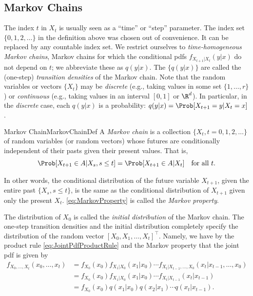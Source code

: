 \subsection{Markov Chains}
The index $t$ in $X_t$ is usually seen as a ``time'' or ``step'' parameter. The index set $\{0, 1, 2, \dots\}$ in the definition above was chosen out of convenience. It can be replaced by any countable index set. We restrict ourselves to \textit{time-homogeneous Markov chains}, Markov chains for which the conditional pdfs $f_{X_{t+1}|X_t}(y|x)$ do not depend on $t$; we abbreviate these as $q(y|x)$. The $\{q(y|x)\}$ are called the (one-step) \textit{transition densities} of the Markov chain. Note that the random variables or vectors $\{X_t\}$ may be \textit{discrete} (e.g., taking values in some set $\{1, \dots, r\}$) or \textit{continuous} (e.g., taking values in an interval $[0, 1]$ or $\R^d$). In particular, in the \textit{discrete} case, each $q(y|x)$ is a probability: $q(y|x) = \Prob[X_{t+1} = y | X_t = x]$.

\begin{defn}{Markov Chain}{MarkovChainDef}
	A \textit{Markov chain} is a collection $\{X_t, t = 0, 1, 2, \dots\}$ of random variables (or random vectors) whose futures are conditionally independent of their pasts given their present values. That is,
	\begin{equation} \label{eq:MarkovProperty}
		\Prob[X_{t+1} \in A | X_s, s \le t] = \Prob[X_{t+1} \in A | X_t] \quad \text{for all } t.
	\end{equation}
\end{defn}
In other words, the conditional distribution of the future variable $X_{t+1}$, given the entire past $\{X_s, s \le t\}$, is the same as the conditional distribution of $X_{t+1}$ given only the present $X_t$. \cref{eq:MarkovProperty} is called the \textit{Markov property}.

The distribution of $X_0$ is called the \textit{initial distribution} of the Markov chain. The one-step transition densities and the initial distribution completely specify the distribution of the random vector $[X_0, X_1, \dots, X_t]^\top$. Namely, we have by the product rule \cref{eq:JointPdfProductRule} and the Markov property that the joint pdf is given by
\begin{align*}
	f_{X_0, \dots, X_t}(x_0, \dots, x_t) & = f_{X_0}(x_0) f_{X_1|X_0}(x_1|x_0) \cdots f_{X_t|X_{t-1}, \dots, X_0}(x_t | x_{t-1}, \dots, x_0) \\
	                                     & = f_{X_0}(x_0) f_{X_1|X_0}(x_1|x_0) \cdots f_{X_t|X_{t-1}}(x_t | x_{t-1})                         \\
	                                     & = f_{X_0}(x_0) q(x_1|x_0) q(x_2|x_1) \cdots q(x_t|x_{t-1}).
\end{align*}

